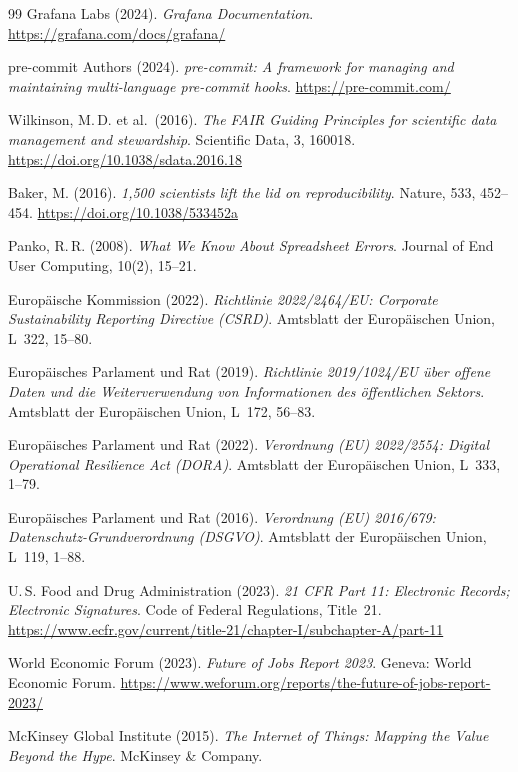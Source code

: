﻿\documentclass[12pt,a4paper]{report}
\theoremstyle{definition}
\theoremstyle{remark}
\begin{document}
\begin{thebibliography}{99}
  Grafana Labs (2024).
  \textit{Grafana Documentation}.
  \url{https://grafana.com/docs/grafana/}

  pre-commit Authors (2024).
  \textit{pre-commit: A framework for managing and maintaining multi-language
  pre-commit hooks}.
  \url{https://pre-commit.com/}

  Wilkinson, M.\,D. et al.\ (2016).
  \textit{The FAIR Guiding Principles for scientific data management
  and stewardship}.
  Scientific Data, 3, 160018.
  \url{https://doi.org/10.1038/sdata.2016.18}

  Baker, M. (2016).
  \textit{1,500 scientists lift the lid on reproducibility}.
  Nature, 533, 452--454.
  \url{https://doi.org/10.1038/533452a}

  Panko, R.\,R. (2008).
  \textit{What We Know About Spreadsheet Errors}.
  Journal of End User Computing, 10(2), 15--21.

  Europäische Kommission (2022).
  \textit{Richtlinie 2022/2464/EU: Corporate Sustainability Reporting
  Directive (CSRD)}.
  Amtsblatt der Europäischen Union, L~322, 15--80.

  Europäisches Parlament und Rat (2019).
  \textit{Richtlinie 2019/1024/EU über offene Daten und die
  Weiterverwendung von Informationen des öffentlichen Sektors}.
  Amtsblatt der Europäischen Union, L~172, 56--83.

  Europäisches Parlament und Rat (2022).
  \textit{Verordnung (EU) 2022/2554: Digital Operational Resilience Act
  (DORA)}.
  Amtsblatt der Europäischen Union, L~333, 1--79.

  Europäisches Parlament und Rat (2016).
  \textit{Verordnung (EU) 2016/679: Datenschutz-Grundverordnung (DSGVO)}.
  Amtsblatt der Europäischen Union, L~119, 1--88.

  U.\,S. Food and Drug Administration (2023).
  \textit{21 CFR Part 11: Electronic Records; Electronic Signatures}.
  Code of Federal Regulations, Title~21.
  \url{https://www.ecfr.gov/current/title-21/chapter-I/subchapter-A/part-11}

  World Economic Forum (2023).
  \textit{Future of Jobs Report 2023}.
  Geneva: World Economic Forum.
  \url{https://www.weforum.org/reports/the-future-of-jobs-report-2023/}

  McKinsey Global Institute (2015).
  \textit{The Internet of Things: Mapping the Value Beyond the Hype}.
  McKinsey \& Company.


\end{thebibliography}
\end{document}
